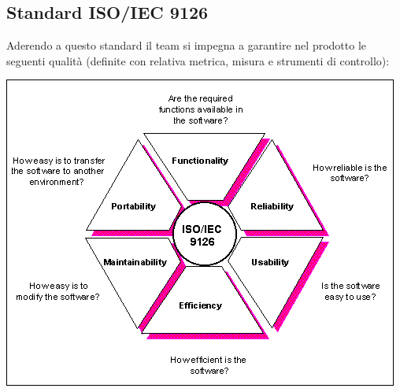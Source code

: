 {\begin{itemize}
  \end{itemize}





















  \subsection{Standard ISO/IEC 9126}

  Aderendo a questo standard il team si impegna a garantire nel prodotto
  le seguenti qualità (definite con relativa metrica, misura e
  strumenti di controllo): \\


  \begin{center}
    \includegraphics[scale=0.5]{img/9126s.png}
  \end{center}




}
